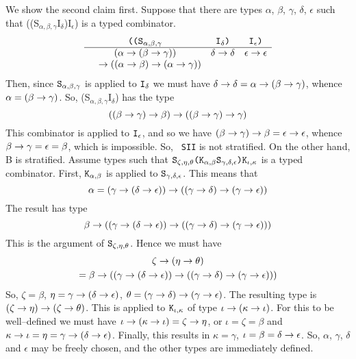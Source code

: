 We show the second claim first. Suppose that there are types
$\alpha$, $\beta$, $\gamma$, $\delta$, $\epsilon$ such that
{\mtt ((S$_{\alpha,\beta,\gamma}$I$_{\delta}$)I$_{\epsilon}$)} 
is a typed combinator.
\begin{equation}
$$\begin{array}{ccc}
\mbox{\tt ((S}_{\alpha,\beta,\gamma} & {\tt I}_{\delta} \mbox{\tt
)} & {\tt I}_{\epsilon}\mbox{\tt )}
\\\hline
(\alpha \pf (\beta\pf\gamma)) & \delta \pf\delta & \epsilon\pf\epsilon \\
	\quad \pf ((\alpha \pf\beta) \pf (\alpha\pf\gamma)) 
	& & 
\end{array}
\end{equation}
Then, since $\mbox{\tt S}_{\alpha,\beta,\gamma}$ is applied to 
$\mbox{\tt I}_{\delta}$ we must have $\delta \pf \delta = \alpha %
\pf (\beta\pf \gamma)$, whence $\alpha = (\beta\rightarrow\gamma)$. So, 
{\mtt (S$_{\alpha,\beta,\gamma}$I$_{\delta}$)} has the type 
\begin{equation}
((\beta \rightarrow \gamma) \rightarrow \beta) \rightarrow ((\beta \rightarrow \gamma) \rightarrow \gamma)
\end{equation}
This combinator is applied to $\mbox{\tt I}_{\epsilon}$, and so we have 
$(\beta\rightarrow\gamma)\rightarrow\beta = \epsilon\rightarrow\epsilon$, whence
$\beta\rightarrow\gamma = \epsilon = \beta$, which is impossible. So, {\tt
SII} is not stratified. On the other hand, {\sf B} is stratified.
Assume types such that $\mbox{\tt S}_{\zeta,\eta,\theta}\mbox{\tt
(K}_{\alpha,\beta} \mbox{\tt S}_{\gamma,\delta,\epsilon}\mbox{\tt
)}\mbox{\tt K}_{\iota,\kappa}$ is a typed combinator. First, ${\tt
K}_{\alpha,\beta}$ is applied to ${\tt
S}_{\gamma,\delta,\epsilon}$. This means that
\begin{equation}
\alpha = (\gamma \rightarrow (\delta\rightarrow\epsilon)) \rightarrow ((\gamma\rightarrow\delta)
\rightarrow (\gamma\rightarrow\epsilon))
\end{equation}
The result has type
\begin{equation}
\beta \rightarrow ((\gamma \rightarrow (\delta\rightarrow\epsilon)) \rightarrow ((\gamma\rightarrow\delta)
\rightarrow (\gamma\rightarrow\epsilon)))
\end{equation}
This is the argument of ${\tt S}_{\zeta,\eta,\theta}$. Hence we
must have
\begin{multline}
\zeta \rightarrow (\eta \rightarrow \theta) \\
= \beta \rightarrow ((\gamma \rightarrow
(\delta\rightarrow\epsilon)) \rightarrow ((\gamma\rightarrow\delta)
\rightarrow (\gamma\rightarrow\epsilon)))
\end{multline}
So, $\zeta = \beta$, $\eta = \gamma\rightarrow(\delta\rightarrow\epsilon)$,
$\theta = (\gamma\rightarrow\delta)\rightarrow(\gamma\rightarrow\epsilon)$. The resulting
type is $(\zeta\rightarrow\eta)\rightarrow(\zeta\rightarrow\theta)$. This is applied to
$\mbox{\tt K}_{\iota,\kappa}$ of type $\iota\rightarrow(\kappa\rightarrow\iota)$.
For this to be well--defined we must have $\iota\rightarrow(\kappa\rightarrow\iota)
= \zeta\rightarrow\eta$, or $\iota = \zeta = \beta$ and $\kappa\rightarrow\iota =
\eta = \gamma\rightarrow(\delta\rightarrow\epsilon)$. Finally, this results in
$\kappa = \gamma$, $\iota = \beta = \delta\rightarrow\epsilon$. So,
$\alpha$, $\gamma$, $\delta$ and $\epsilon$ may be freely chosen,
and the other types are immediately defined.

